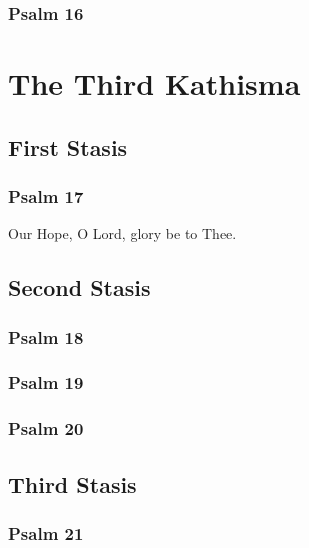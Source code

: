 \documentclass[12pt]{book}
\newcommand{\kathismabreak}{
  \medskip
  \begin{center}
  \begin{footnotesize}
  

  

  

  
  \end{footnotesize}
  \end{center}
  \smallbreak
}
\newcommand{\kathismaend}{
  \medskip
  \begin{center}
  \begin{footnotesize}
  

  

  Our Hope, O Lord, glory be to Thee.
  \end{footnotesize}
  \end{center}
  \smallbreak
}
\begin{document}
\subsubsection{Psalm 16}


\kathismabreak

\section{The Third Kathisma}

\subsection{First Stasis}

\subsubsection{Psalm 17}


\kathismaend

\subsection{Second Stasis}

\subsubsection{Psalm 18}


\subsubsection{Psalm 19}


\subsubsection{Psalm 20}


\kathismabreak

\pagebreak %
\subsection{Third Stasis}

\subsubsection{Psalm 21}

\end{document}
